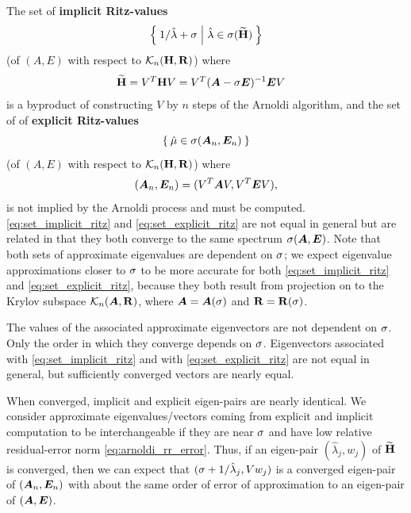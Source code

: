 The set of \textbf{implicit Ritz-values}
\begin{equation}
\Set{1/\hat{\lambda}+\sigma| \hat{\lambda}\in\sigma(\widetilde{\textbf{\textup{H}}})}
\label{eq:set_implicit_ritz}
\end{equation}
 (of $(A,E)$ with respect to $\mathcal{K}_{n}({\textbf{\textup{H}}},{\textbf{\textup{R}}})$) where
\begin{align*}
\widetilde{\textbf{\textup{H}}} = V^T \textbf{\textup{H}} V &= V^T (\bm{A} - \sigma \bm{E})^{-1}\bm{E} V
\end{align*}
is a byproduct of constructing $V$ by $n$ steps of the Arnoldi algorithm, and the set of of \textbf{explicit Ritz-values}
\begin{equation}
\Set{\hat{\mu}\in\sigma(\bm{A}_n,\bm{E}_n)}
\label{eq:set_explicit_ritz}
\end{equation}
 (of $(A,E)$ with respect to $\mathcal{K}_{n}({\textbf{\textup{H}}},{\textbf{\textup{R}}})$) where  
\[
(\bm{A}_n,\bm{E}_n)= (V^T \bm{A} V, V^T \bm{E} V),
\]
is not implied by the Arnoldi process and must be computed.  \eqref{eq:set_implicit_ritz} and \eqref{eq:set_explicit_ritz} are not equal in general but are related in that they both converge to the same spectrum $\sigma(\bm{A},\bm{E})$.  Note that both sets of approximate eigenvalues are dependent on $\sigma$; we expect eigenvalue approximations closer to $\sigma$ to be more accurate for both \eqref{eq:set_implicit_ritz} and \eqref{eq:set_explicit_ritz}, because they both result from projection on to the Krylov subspace $\mathcal{K}_{n}({\bm{A}},{\textbf{\textup{R}}})$, where $\bm{A}=\bm{A}(\sigma)$ and $\textbf{\textup{R}}=\textbf{\textup{R}}(\sigma)$.

   The values of the associated approximate eigenvectors are not dependent on $\sigma$.   Only the order in which they converge depends on $\sigma$.  Eigenvectors associated with  \eqref{eq:set_implicit_ritz} and with \eqref{eq:set_explicit_ritz} are not equal in general, but sufficiently converged vectors are nearly equal.

  When converged, implicit  and explicit  eigen-pairs are nearly identical. We consider approximate eigenvalues/vectors coming from explicit and implicit computation to be interchangeable if they are near $\sigma$ and have low relative residual-error norm \eqref{eq:arnoldi_rr_error}.   Thus, if an eigen-pair $(\hat{\lambda}_j,w_j)$ of $\widetilde{\textbf{\textup{H}}}$ is converged, then we can expect that $(\sigma+1/\hat{\lambda}_j,V w_j)$ is a converged eigen-pair of $(\bm{A}_n,\bm{E}_n)$ with about the same order of error of approximation to an eigen-pair of $(\bm{A},\bm{E})$.  

